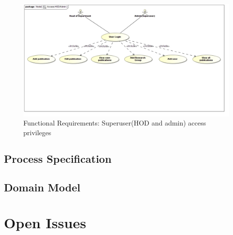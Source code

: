 \documentclass[a4paper]{article}
\begin{document}
\begin{figure}[H]
\includegraphics[width=\textwidth]{AccessHODAdmin.jpg}
\caption{Functional Requirements: Superuser(HOD and admin) access privileges \label{overflow}}
\end{figure}
\subsection{Process Specification}
\subsection{Domain Model}


\section{Open Issues}
\end{document}
